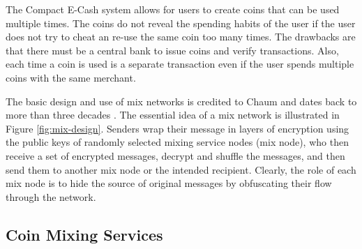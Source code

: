 The Compact E-Cash system allows for users to create coins that can be used multiple times.  The coins do not reveal the spending habits of the user if the user does not try to cheat an re-use the same coin too many times.  The drawbacks are that there must be a central bank to issue coins and verify transactions.  Also, each time a coin is used is a separate transaction even if the user spends multiple coins with the same merchant.

The basic design and use of mix networks is credited to Chaum and dates back to more than three decades \cite{Chaum81-Mix}. The essential idea of a mix network is illustrated in Figure \ref{fig:mix-design}. Senders wrap their message in layers of encryption using the public keys of randomly selected mixing service nodes (mix node), who then receive a set of encrypted messages, decrypt and shuffle the messages, and then send them to another mix node or the intended recipient. Clearly, the role of each mix node is to hide the source of original messages by obfuscating their flow through the network. 



\subsection{Coin Mixing Services}

